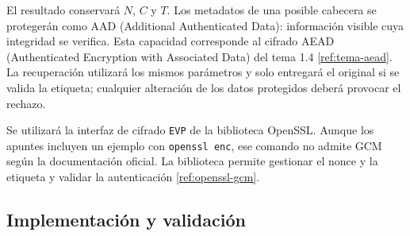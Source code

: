 El resultado conservará $N$, $C$ y $T$. Los metadatos de una posible cabecera se protegerán como AAD (Additional Authenticated Data): información visible cuya integridad se verifica. Esta capacidad corresponde al cifrado AEAD (Authenticated Encryption with Associated Data) del tema 1.4 \ref{ref:tema-aead}. La recuperación utilizará los mismos parámetros y solo entregará el original si se valida la etiqueta; cualquier alteración de los datos protegidos deberá provocar el rechazo.

Se utilizará la interfaz de cifrado \texttt{EVP} de la biblioteca OpenSSL. Aunque los apuntes incluyen un ejemplo con \texttt{openssl enc}, ese comando no admite GCM según la documentación oficial. La biblioteca permite gestionar el nonce y la etiqueta y validar la autenticación \ref{ref:openssl-gcm}.

\subsection{Implementación y validación}
